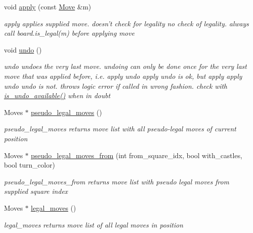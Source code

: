 \begin{DoxyCompactItemize}
void \hyperlink{classchess_1_1Board_a5d17441690ffdf9a1000309e2272f6de}{apply} (const \hyperlink{classchess_1_1Move}{Move} \&m)
\begin{DoxyCompactList}\small\item\em apply applies supplied move. doesn't check for legality no check of legality. always call board.\-is\-\_\-legal(m) before applying move \end{DoxyCompactList}\item 
\hypertarget{classchess_1_1Board_afbd72bf71259ba08016f6b547075d19b}{void \hyperlink{classchess_1_1Board_afbd72bf71259ba08016f6b547075d19b}{undo} ()}\label{classchess_1_1Board_afbd72bf71259ba08016f6b547075d19b}

\begin{DoxyCompactList}\small\item\em undo undoes the very last move. undoing can only be done once for the very last move that was applied before, i.\-e. apply undo apply undo is ok, but apply apply undo undo is not. throws logic error if called in wrong fashion. check with \hyperlink{classchess_1_1Board_a0c19f4ee4fed148786b1215790f62a0e}{is\-\_\-undo\-\_\-available()} when in doubt \end{DoxyCompactList}\item 
Moves $\ast$ \hyperlink{classchess_1_1Board_ac9aa7f45517551baa208ed49ede59d97}{pseudo\-\_\-legal\-\_\-moves} ()
\begin{DoxyCompactList}\small\item\em pseudo\-\_\-legal\-\_\-moves returns move list with all pseudo-\/legal moves of current position \end{DoxyCompactList}\item 
Moves $\ast$ \hyperlink{classchess_1_1Board_a9d573f32784dd7744640a5709c44de50}{pseudo\-\_\-legal\-\_\-moves\-\_\-from} (int from\-\_\-square\-\_\-idx, bool with\-\_\-castles, bool turn\-\_\-color)
\begin{DoxyCompactList}\small\item\em pseudo\-\_\-legal\-\_\-moves\-\_\-from returns move list with pseudo legal moves from supplied square index \end{DoxyCompactList}\item 
Moves $\ast$ \hyperlink{classchess_1_1Board_af33abea2f6fba7df0e683fa1198a8520}{legal\-\_\-moves} ()
\begin{DoxyCompactList}\small\item\em legal\-\_\-moves returns move list of all legal moves in position \end{DoxyCompactList}\item 

\end{DoxyCompactItemize}
